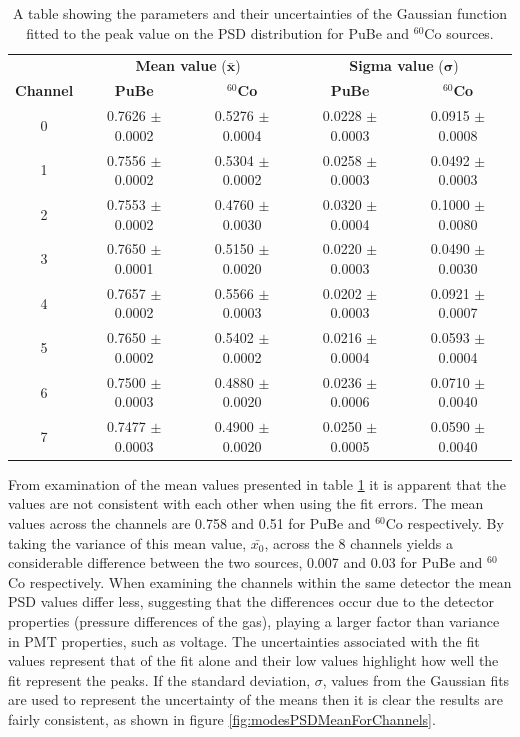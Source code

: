 \begin{table}[h]
\centering
	\begin{tabular}{ccccc}
	\hline
	& \multicolumn{2}{c}{\textbf{Mean value} ($\mathbf{\bar{x}}$)} & \multicolumn{2}{c}{\textbf{Sigma value} ($\mathbf{\sigma}$)} \\
	\textbf{Channel} & \textbf{PuBe} & \textbf{$^{60}$Co} & \textbf{PuBe} & \textbf{$^{60}$Co} \\
	\hline
	0  & 0.7626 $\pm$ 0.0002 & 0.5276 $\pm$ 0.0004 & 0.0228 $\pm$ 0.0003 & 0.0915 $\pm$ 0.0008\\ 
	1  & 0.7556 $\pm$ 0.0002 & 0.5304 $\pm$ 0.0002 & 0.0258 $\pm$ 0.0003 & 0.0492 $\pm$ 0.0003\\ 
	2  & 0.7553 $\pm$ 0.0002 & 0.4760 $\pm$ 0.0030 & 0.0320 $\pm$ 0.0004 & 0.1000 $\pm$ 0.0080\\ 
	3  & 0.7650 $\pm$ 0.0001 & 0.5150 $\pm$ 0.0020 & 0.0220 $\pm$ 0.0003 & 0.0490 $\pm$ 0.0030\\ 
	4  & 0.7657 $\pm$ 0.0002 & 0.5566 $\pm$ 0.0003 & 0.0202 $\pm$ 0.0003 & 0.0921 $\pm$ 0.0007\\ 
	5  & 0.7650 $\pm$ 0.0002 & 0.5402 $\pm$ 0.0002 & 0.0216 $\pm$ 0.0004 & 0.0593 $\pm$ 0.0004\\ 
	6  & 0.7500 $\pm$ 0.0003 & 0.4880 $\pm$ 0.0020 & 0.0236 $\pm$ 0.0006 & 0.0710 $\pm$ 0.0040\\ 
	7  & 0.7477 $\pm$ 0.0003 & 0.4900 $\pm$ 0.0020 & 0.0250 $\pm$ 0.0005 & 0.0590 $\pm$ 0.0040\\ 
	\hline
\end{tabular}
\caption{A table showing the parameters and their uncertainties of the Gaussian function fitted to the peak value on the PSD distribution for PuBe and $^{60}$Co sources.}
\label{tab:modesPSDAllChannelsRawValues}
\end{table}

From examination of the mean values presented in table \ref{tab:modesPSDAllChannelsRawValues} it is apparent that the values are not consistent with each other when using the fit errors. The mean values across the channels are 0.758 and 0.51 for PuBe and $^{60}$Co respectively. By taking the variance of this mean value, $\bar{x_{0}}$, across the 8 channels yields a considerable difference between the two sources, 0.007 and 0.03 for PuBe and $^{60}$Co respectively. When examining the channels within the same detector the mean PSD values differ less, suggesting that the differences occur due to the detector properties (pressure differences of the gas), playing a larger factor than variance in PMT properties, such as voltage. The uncertainties associated with the fit values represent that of the fit alone and their low values highlight how well the fit represent the peaks. If the standard deviation, $\sigma$, values from the Gaussian fits are used to represent the uncertainty of the means then it is clear the results are fairly consistent, as shown in figure \ref{fig:modesPSDMeanForChannels}.

